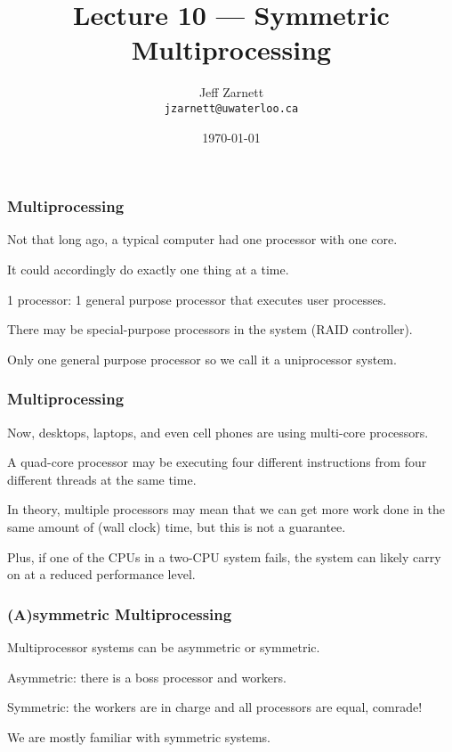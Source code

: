 

\title{Lecture 10 --- Symmetric Multiprocessing }

\author{Jeff Zarnett \\ \small \texttt{jzarnett@uwaterloo.ca}}
\date{\today}




\begin{frame}
  \titlepage

 \end{frame}

 
\begin{frame}
\frametitle{Multiprocessing}

Not that long ago, a typical computer had one processor with one core. 

It could accordingly do exactly one thing at a time. 

1 processor: 1 general purpose processor that executes user processes. 

There may be special-purpose processors in the system (RAID controller). 

Only one general purpose processor so we call it a uniprocessor system.



\end{frame}

 
\begin{frame}
\frametitle{Multiprocessing}

Now, desktops, laptops, and even cell phones are using multi-core processors.

A quad-core processor may be executing four different instructions from four different threads at the same time. 

In theory, multiple processors may mean that we can get more work done in the same amount of (wall clock) time, but this is not a guarantee. 

Plus, if one of the CPUs in a two-CPU system fails, the system can likely carry on at a reduced performance level.

\end{frame}

 
\begin{frame}
\frametitle{(A)symmetric Multiprocessing}

Multiprocessor systems can be \alert{asymmetric} or \alert{symmetric}.

Asymmetric: there is a \alert{boss} processor and \alert{workers}.

Symmetric: the workers are in charge and all processors are equal, comrade!

We are mostly familiar with symmetric systems.

\end{frame}

